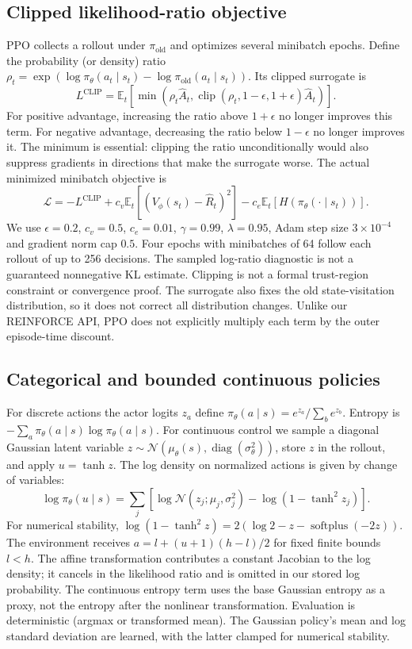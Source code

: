 \documentclass[11pt,a4paper]{article}
\newcommand{\E}{\mathbb E}
\begin{document}
\subsection{Clipped likelihood-ratio objective}
PPO \cite{ppo} collects a rollout under $\pi_{\mathrm{old}}$ and optimizes
several minibatch epochs. Define the probability (or density) ratio
$\rho_t=\exp(\log\pi_\theta(a_t\mid s_t)-
\log\pi_{\mathrm{old}}(a_t\mid s_t))$. Its clipped surrogate is
\[
L^{\mathrm{CLIP}}=\E_t\left[\min\left(\rho_t\hat A_t,
\operatorname{clip}(\rho_t,1-\epsilon,1+\epsilon)\hat A_t\right)\right].
\]
For positive advantage, increasing the ratio above $1+\epsilon$ no longer
improves this term. For negative advantage, decreasing the ratio below
$1-\epsilon$ no longer improves it. The minimum is essential: clipping the
ratio unconditionally would also suppress gradients in directions that make
the surrogate worse. The actual minimized minibatch objective is
\[
\mathcal L=-L^{\mathrm{CLIP}}+c_v\E_t[(V_\phi(s_t)-\hat R_t)^2]
-c_e\E_t[H(\pi_\theta(\cdot\mid s_t))].
\]
We use $\epsilon=0.2$, $c_v=0.5$, $c_e=0.01$, $\gamma=0.99$,
$\lambda=0.95$, Adam step size $3\times10^{-4}$ and gradient norm cap $0.5$.
Four epochs with minibatches of 64 follow each rollout of up to 256 decisions.
The sampled log-ratio diagnostic is not a guaranteed nonnegative KL estimate.
Clipping is not a formal trust-region constraint or convergence proof. The
surrogate also fixes the old state-visitation distribution, so it does not
correct all distribution changes. Unlike our REINFORCE API, PPO does not
explicitly multiply each term by the outer episode-time discount.

\subsection{Categorical and bounded continuous policies}
For discrete actions the actor logits $z_a$ define
$\pi_\theta(a\mid s)=e^{z_a}/\sum_b e^{z_b}$. Entropy is
$-\sum_a\pi_\theta(a\mid s)\log\pi_\theta(a\mid s)$.
For continuous control we sample a diagonal Gaussian latent variable
$z\sim\mathcal N(\mu_\theta(s),\operatorname{diag}(\sigma_\theta^2))$,
store $z$ in the rollout, and apply $u=\tanh z$. The log density on normalized
actions is given by change of variables:
\[
\log\pi_\theta(u\mid s)=\sum_j\left[\log\mathcal N(z_j;\mu_j,\sigma_j^2)
-\log(1-\tanh^2 z_j)\right].
\]
For numerical stability, $\log(1-\tanh^2 z)=2(\log 2-z-\operatorname{softplus}(-2z))$.
The environment receives $a=l+(u+1)(h-l)/2$ for fixed finite bounds $l<h$.
The affine transformation contributes a constant Jacobian to the log density;
it cancels in the likelihood ratio and is omitted in our stored log probability.
The continuous entropy term uses the base Gaussian entropy as a proxy, not the
entropy after the nonlinear transformation. Evaluation is deterministic (argmax
or transformed mean). The Gaussian policy's mean and log standard deviation
are learned, with the latter clamped for numerical stability.
\end{document}

